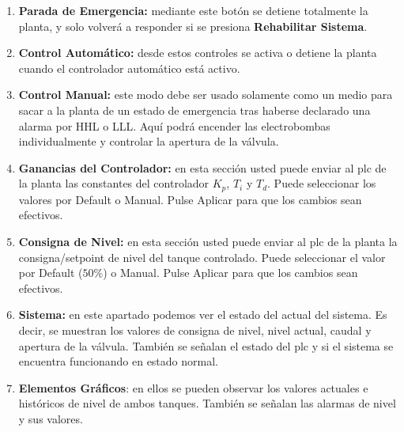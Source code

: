 \begin{enumerate}
\item \textbf{Parada de Emergencia:} mediante este botón se detiene totalmente
la planta, y solo volverá a responder si se presiona \textbf{Rehabilitar
Sistema}.
 \item \textbf{Control Automático:} desde estos controles se activa o detiene
la planta cuando el controlador automático está activo.
 \item \textbf{Control Manual:} este modo debe ser usado solamente como un
medio para
sacar a la planta de un estado de emergencia tras  haberse declarado una alarma
por HHL o LLL.
Aquí podrá encender las electrobombas individualmente y controlar la apertura
de la válvula.
 \item \textbf{Ganancias del Controlador:} en esta sección usted puede enviar al
\gls{plc} de la planta las constantes del controlador $K_p$, $T_i$ y $T_d$. 
Puede seleccionar los valores por Default o Manual. Pulse Aplicar para que los
cambios sean efectivos.
 \item \textbf{Consigna de Nivel:} en esta sección usted puede enviar al
\gls{plc} de la planta la consigna/setpoint de nivel del tanque controlado. 
Puede seleccionar el valor por Default ($50\%$) o Manual. Pulse Aplicar para
que
los cambios sean efectivos.
 \item \textbf{Sistema:} en este apartado podemos ver el estado del actual del
sistema. Es decir, se muestran los valores de consigna de nivel, nivel
actual, caudal y apertura de la válvula. También se señalan el estado del 
\gls{plc} y si el sistema se encuentra funcionando en estado normal.
\item \textbf{Elementos Gráficos}: en ellos se pueden observar los valores
actuales e
históricos de nivel de ambos tanques. También se señalan las alarmas de nivel y
sus valores.
\end{enumerate}
